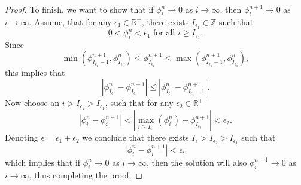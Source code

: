 \documentclass[../thesis.tex]{subfiles}
\begin{document}
\begin{theorem}
\begin{proof}
    To finish, we want to show that if \(\phi_{i}^{n} \rightarrow 0 \)  as \(i \rightarrow \infty\), then \(\phi_{i}^{n+1} \rightarrow 0 \) as \(i \rightarrow \infty\).
    Assume, that for any \(\epsilon_1 \in \mathbb{R}^+\), there exists \(I_{\epsilon_1} \in \mathbb{Z}\) such that
    \begin{equation}\label{eqn:proof-compact-2}
        0 < \phi_{i}^{n} < \epsilon_1 \text{ for all } i \geq I_{\epsilon_1}.
    \end{equation}
    Since
    \begin{equation}
        \min\left( \phi_{I_{\epsilon_1}-1}^{n+1},\phi_{I_{\epsilon_1}}^{n} \right)
            \leq
            \phi_{I_{\epsilon_1}}^{n+1}
            \leq
            \max\left( \phi_{I_{\epsilon_1}-1}^{n+1},\phi_{I_{\epsilon_1}}^{n} \right),
    \end{equation}
    this implies that
    \[
        |\phi_{I_{\epsilon_1}}^{n} - \phi_{I_{\epsilon_1}}^{n+1}|
        \leq
        |\phi_{I_{\epsilon_1}}^{n} - \phi_{I_{\epsilon_1}-1}^{n+1}|.
    \]
    Now choose an \(i > I_{\epsilon_2} > I_{\epsilon_1}\), such that for any \(\epsilon_2 \in \mathbb{R}^+\)
    \[
        |\phi_{i}^{n} - \phi_{i}^{n+1}|
        < |\max_{i \geq I_{\epsilon_1}}(\phi_{i}^{n}) - \phi_{I_{\epsilon_2}}^{n+1}| < \epsilon_2.
    \]
    Denoting \(\epsilon = \epsilon_1 + \epsilon_2\) we conclude that there exists
    \(I_{\epsilon} > I_{\epsilon_2} > I_{\epsilon_1}\) such that
    \[
        |\phi_{i}^{n} - \phi_{i}^{n+1}| < \epsilon,
    \]
    which implies that if \(\phi_{i}^{n} \rightarrow 0 \) as \(i \rightarrow \infty\), then the solution will also \(\phi_{i}^{n+1} \rightarrow 0 \) as \(i \rightarrow \infty\), thus completing the proof.
\end{proof}
\end{theorem}
\end{document}
